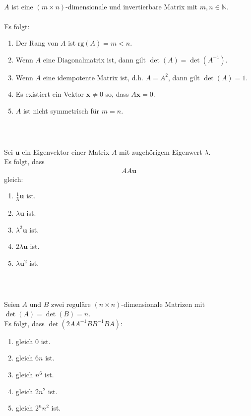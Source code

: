 \subsection*{}
$A$ ist eine $(m \times n)$-dimensionale und invertierbare Matrix mit $m,n \in \mathbb{N}$.\\
\\
Es folgt:
\renewcommand{\labelenumi}{(\alph{enumi})}
\begin{enumerate}
\item 
Der Rang von $A$ ist $\mathrm{rg}(A) = m < n$.
\item 
Wenn $A$ eine Diagonalmatrix ist, dann gilt $\det(A) = \det(A^{-1})$.
\item 
Wenn $A$ eine idempotente Matrix ist, d.h. $A = A^2$, dann gilt $\det(A) = 1$.
\item 
Es existiert ein Vektor $\mathbf{x} \neq 0$ so, dass $A \mathbf{x} = 0$.
\item 
$A$ ist nicht symmetrisch  für $m=n$. 
\end{enumerate}
\ \\
\subsection*{}
Sei $\mathbf{u} $ ein Eigenvektor einer Matrix $A$ mit zugehörigem Eigenwert $\lambda$.
\\
Es folgt, dass 
\begin{align*}
	AA \mathbf{u}
\end{align*}
gleich:
\renewcommand{\labelenumi}{(\alph{enumi})}
\begin{enumerate}
	\item 
	$ \frac{1}{\lambda} \mathbf{u} $ ist.
	\item 
	$ \lambda \mathbf{u} $ ist.
	\item
	$ \lambda^2 \mathbf{u}$ ist.
	\item
	$ 2\lambda \mathbf{u} $ ist.
	\item 
	$ \lambda \mathbf{u}^2 $ ist.
\end{enumerate}
\ \\
\subsection*{}
Seien $A$ und $B$ zwei reguläre $(n \times n)$-dimensionale Matrizen mit $\det(A) = \det(B) = n$.\\
Es folgt, dass $\det(2AA^{-1} B B^{-1} B A)$:
\renewcommand{\labelenumi}{(\alph{enumi})}
\begin{enumerate}
\item 
gleich $0$ ist.
\item
gleich $6n$ ist.
\item
gleich $n^6$ ist.
\item
gleich $2 n^2$ ist.
\item
gleich $2^n n^2$ ist.
\end{enumerate}
\newpage
